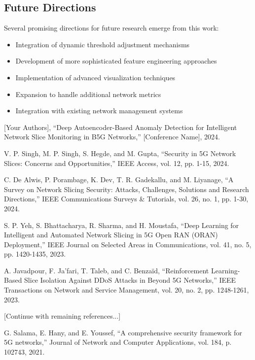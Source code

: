 \documentclass[12pt, a4paper]{article}
\begin{document}
\subsection{Future Directions}
Several promising directions for future research emerge from this work:
\begin{itemize}
    \item Integration of dynamic threshold adjustment mechanisms
    \item Development of more sophisticated feature engineering approaches
    \item Implementation of advanced visualization techniques
    \item Expansion to handle additional network metrics
    \item Integration with existing network management systems
\end{itemize}


\begin{thebibliography}{36}
[Your Authors], ``Deep Autoencoder-Based Anomaly Detection for Intelligent Network Slice Monitoring in B5G Networks,'' [Conference Name], 2024.

V. P. Singh, M. P. Singh, S. Hegde, and M. Gupta, ``Security in 5G Network Slices: Concerns and Opportunities,'' IEEE Access, vol. 12, pp. 1-15, 2024.

C. De Alwis, P. Porambage, K. Dev, T. R. Gadekallu, and M. Liyanage, ``A Survey on Network Slicing Security: Attacks, Challenges, Solutions and Research Directions,'' IEEE Communications Surveys \& Tutorials, vol. 26, no. 1, pp. 1-30, 2024.

S. P. Yeh, S. Bhattacharya, R. Sharma, and H. Moustafa, ``Deep Learning for Intelligent and Automated Network Slicing in 5G Open RAN (ORAN) Deployment,'' IEEE Journal on Selected Areas in Communications, vol. 41, no. 5, pp. 1420-1435, 2023.

A. Javadpour, F. Ja'fari, T. Taleb, and C. Benzaïd, ``Reinforcement Learning-Based Slice Isolation Against DDoS Attacks in Beyond 5G Networks,'' IEEE Transactions on Network and Service Management, vol. 20, no. 2, pp. 1248-1261, 2023.

[Continue with remaining references...]

G. Salama, E. Hany, and E. Youssef, ``A comprehensive security framework for 5G networks,'' Journal of Network and Computer Applications, vol. 184, p. 102743, 2021.

\end{thebibliography}
\end{document}
